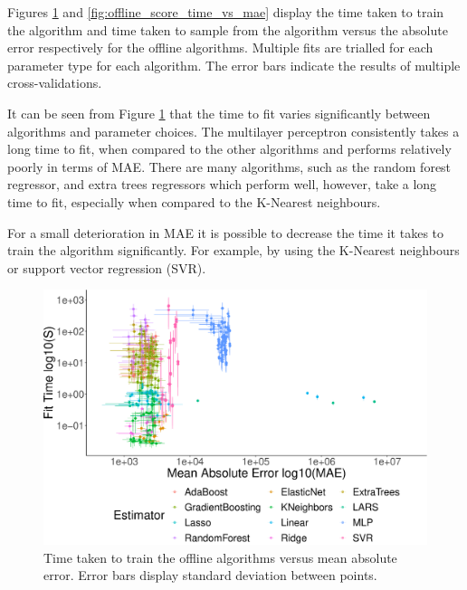 \documentclass[final,3p,times,twocolumn,numbers]{elsarticle}
\begin{document}
Figures \ref{fig:offline_fit_time_vs_mae} and \ref{fig:offline_score_time_vs_mae} display the time taken to train the algorithm and time taken to sample from the algorithm versus the absolute error respectively for the offline algorithms. Multiple fits are trialled for each parameter type for each algorithm. The error bars indicate the results of multiple cross-validations.

It can be seen from Figure \ref{fig:offline_fit_time_vs_mae} that the time to fit varies significantly between algorithms and parameter choices. The multilayer perceptron consistently takes a long time to fit, when compared to the other algorithms and performs relatively poorly in terms of MAE. There are many algorithms, such as the random forest regressor, and extra trees regressors which perform well, however, take a long time to fit, especially when compared to the K-Nearest neighbours.

For a small deterioration in MAE it is possible to decrease the time it takes to train the algorithm significantly. For example, by using the K-Nearest neighbours or support vector regression (SVR).


\begin{figure}[h]
\centering
\includegraphics[width=\columnwidth]{figures/results/offline_fit_time_vs_mae_all_results_opaque.eps}
\caption{Time taken to train the offline algorithms versus mean absolute error. Error bars display standard deviation between points.}
\label{fig:offline_fit_time_vs_mae}
\end{figure}
\end{document}

